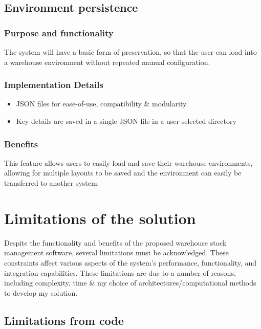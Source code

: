 \subsection{Environment persistence}
\subsubsection{Purpose and functionality}
The system will have a basic form of preservation, so that the user can load into a warehouse environment without repeated manual configuration.

\subsubsection{Implementation Details}
\begin{itemize}
    \item JSON files for ease-of-use, compatibility \& modularity
    \item Key details are saved in a single JSON file in a user-selected directory
\end{itemize}

\subsubsection{Benefits}
This feature allows users to easily load and save their warehouse environments, allowing for multiple layouts to be saved and the environment can easily be transferred to another system.


\section{Limitations of the solution}

Despite the functionality and benefits of the proposed warehouse stock management software, several limitations must be acknowledged. These constraints affect various aspects of the system's performance, functionality, and integration capabilities. These limitations are due to a number of reasons, including complexity, time \& my choice of architectures/computational methods to develop my solution.

\subsection{Limitations from code}

